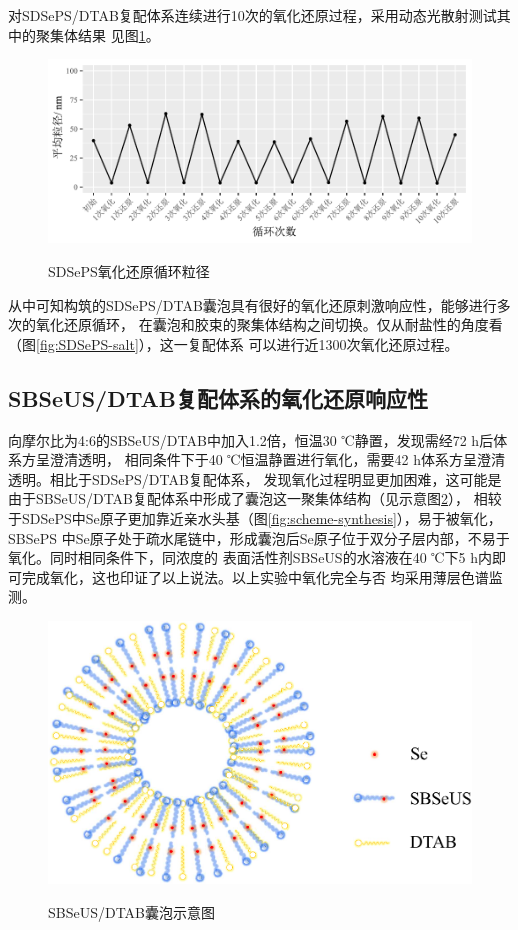 \documentclass[bachelor,fandolfonts,replaceperiod]{jnuthesis}
\begin{document}
    对SDSePS/DTAB复配体系连续进行10次的氧化还原过程，采用动态光散射测试其中的聚集体结果
    见图\ref{fig:SDSePS-redox-circle}。
    \begin{figure}[htbp]
        \centering
        \includegraphics[width=.86\textwidth]{figure/SDSePS-redox-circle.pdf}\\
        \caption{SDSePS氧化还原循环粒径}\label{fig:SDSePS-redox-circle}
    \end{figure}
    从中可知构筑的SDSePS/DTAB囊泡具有很好的氧化还原刺激响应性，能够进行多次的氧化还原循环，
    在囊泡和胶束的聚集体结构之间切换。仅从耐盐性的角度看（图\ref{fig:SDSePS-salt}），这一复配体系
    可以进行近1300次氧化还原过程。
    
    \subsection{SBSeUS/DTAB复配体系的氧化还原响应性}
    向摩尔比为4:6的SBSeUS/DTAB中加入1.2倍，恒温30 ℃静置，发现需经72 h后体系方呈澄清透明，
    相同条件下于40 ℃恒温静置进行氧化，需要42 h体系方呈澄清透明。相比于SDSePS/DTAB复配体系，
    发现氧化过程明显更加困难，这可能是由于SBSeUS/DTAB复配体系中形成了囊泡这一聚集体结构（见示意图\ref{fig:scheme-vesicle}），
    相较于SDSePS中Se原子更加靠近亲水头基（图\ref{fig:scheme-synthesis}），易于被氧化，SBSePS
    中Se原子处于疏水尾链中，形成囊泡后Se原子位于双分子层内部，不易于氧化。同时相同条件下，同浓度的
    表面活性剂SBSeUS的水溶液在40 ℃下5 h内即可完成氧化，这也印证了以上说法。以上实验中氧化完全与否
    均采用薄层色谱监测。
    \begin{figure}[htbp]
        \centering
        \includegraphics[width=0.46\linewidth]{figure/vesicle-scheme.pdf}\\
        \caption{SBSeUS/DTAB囊泡示意图}\label{fig:scheme-vesicle}
    \end{figure}
    
\end{document}
